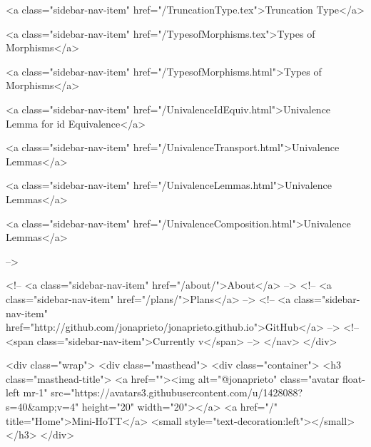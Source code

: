       
    
      
        
          <a class="sidebar-nav-item" href="/TruncationType.tex">Truncation Type</a>
        
      
    
      
        
          <a class="sidebar-nav-item" href="/TypesofMorphisms.tex">Types of Morphisms</a>
        
      
    
      
        
          <a class="sidebar-nav-item" href="/TypesofMorphisms.html">Types of Morphisms</a>
        
      
    
      
        
          <a class="sidebar-nav-item" href="/UnivalenceIdEquiv.html">Univalence Lemma for id Equivalence</a>
        
      
    
      
        
          <a class="sidebar-nav-item" href="/UnivalenceTransport.html">Univalence Lemmas</a>
        
      
    
      
        
          <a class="sidebar-nav-item" href="/UnivalenceLemmas.html">Univalence Lemmas</a>
        
      
    
      
        
          <a class="sidebar-nav-item" href="/UnivalenceComposition.html">Univalence Lemmas</a>
        
      
     -->

    <!-- <a class="sidebar-nav-item" href="/about/">About</a> -->
    <!-- <a class="sidebar-nav-item" href="/plans/">Plans</a> -->
    <!-- <a class="sidebar-nav-item" href="http://github.com/jonaprieto/jonaprieto.github.io">GitHub</a> -->
    <!-- <span class="sidebar-nav-item">Currently v</span> -->
  </nav>
</div>

    <div class="wrap">
      <div class="masthead">
        <div class="container">
          <h3 class="masthead-title">
            <a href=""><img alt="@jonaprieto" class="avatar float-left mr-1" src="https://avatars3.githubusercontent.com/u/1428088?s=40&amp;v=4" height="20" width="20"></a>
            <a href="/" title="Home">Mini-HoTT</a>
            <small style="text-decoration:left"></small>
          </h3>
        </div>
      
